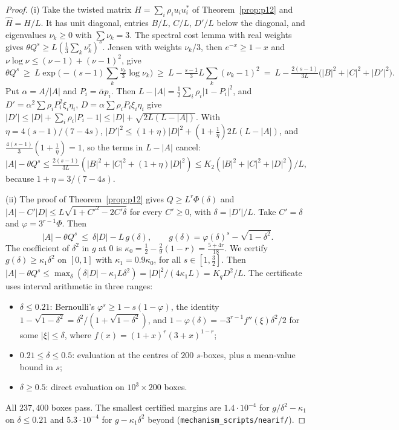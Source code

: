 \documentclass[11pt]{article}
\theoremstyle{definition}
\begin{document}
\begin{proof}
(i) Take the twisted matrix $H=\sum_i\rho_iu_iu_i^*$ of Theorem~\ref{prop:p12} and $\hat H=H/L$.  It has unit diagonal, entries $B/L$, $C/L$, $D'/L$ below the diagonal, and eigenvalues
$\nu_k\ge0$ with $\sum\nu_k=3$.  The spectral cost lemma with real weights gives $\theta Q^s\ge L(\frac13\sum_k\nu_k^r)^s$.  Jensen with weights $\nu_k/3$, then
$e^{-x}\ge1-x$ and $\nu\log\nu\le(\nu-1)+(\nu-1)^2$, give
\[\theta Q^s\ \ge\ L\exp\Big(-(s-1)\sum_k\tfrac{\nu_k}3\log\nu_k\Big)\ \ge\ L-\tfrac{s-1}3L\sum_k(\nu_k-1)^2\ =\ L-\tfrac{2(s-1)}{3L}\big(|B|^2+|C|^2+|D'|^2\big).\]
Put $\alpha=A/|A|$ and $P_i=\bar\alpha p_i$.  Then $L-|A|=\frac12\sum_i\rho_i|1-P_i|^2$, and $D'=\alpha^2\sum\rho_iP_i^2\xi_i\eta_i$, $D=\alpha\sum\rho_iP_i\xi_i\eta_i$ give
$|D'|\le|D|+\sum_i\rho_i|P_i-1|\le|D|+\sqrt{2L(L-|A|)}$.  With $\eta=4(s-1)/(7-4s)$, $|D'|^2\le(1+\eta)|D|^2+(1+\frac1\eta)2L(L-|A|)$, and
$\frac{4(s-1)}3(1+\frac1\eta)=1$, so the terms in $L-|A|$ cancel:
$|A|-\theta Q^s\le\frac{2(s-1)}{3L}(|B|^2+|C|^2+(1+\eta)|D|^2)\le K_2(|B|^2+|C|^2+|D|^2)/L$, because $1+\eta=3/(7-4s)$.

(ii) The proof of Theorem~\ref{prop:p12} gives $Q\ge L^r\Phi(\delta)$ and $|A|-C'|D|\le L\sqrt{1+C'^2-2C'\delta}$ for every $C'\ge0$, with $\delta=|D'|/L$.  Take $C'=\delta$ and $\varphi=3^{r-1}\Phi$.  Then
\[|A|-\theta Q^s\ \le\ \delta|D|-L\,g(\delta),\qquad g(\delta)=\varphi(\delta)^s-\sqrt{1-\delta^2}.\]
The coefficient of $\delta^2$ in $g$ at $0$ is $\kappa_0=\frac12-\frac29(1-r)=\frac{5+4r}{18}$.  We certify $g(\delta)\ge\kappa_1\delta^2$ on $[0,1]$ with $\kappa_1=0.9\kappa_0$, for all $s\in[1,\frac32]$.
Then $|A|-\theta Q^s\le\max_\delta(\delta|D|-\kappa_1L\delta^2)=|D|^2/(4\kappa_1L)=K_qD^2/L$.  The certificate uses interval arithmetic in three ranges:
\begin{itemize}
\item $\delta\le0.21$: Bernoulli's $\varphi^s\ge1-s(1-\varphi)$, the identity $1-\sqrt{1-\delta^2}=\delta^2/(1+\sqrt{1-\delta^2})$, and $1-\varphi(\delta)=-3^{r-1}f''(\xi)\delta^2/2$ for some $|\xi|\le\delta$, where $f(x)=(1+x)^r(3+x)^{1-r}$;
\item $0.21\le\delta\le0.5$: evaluation at the centres of $200$ $s$-boxes, plus a mean-value bound in $s$;
\item $\delta\ge0.5$: direct evaluation on $10^3\times200$ boxes.
\end{itemize}
All $237{,}400$ boxes pass.  The smallest certified margins are $1.4\cdot10^{-4}$ for $g/\delta^2-\kappa_1$ on $\delta\le0.21$ and $5.3\cdot10^{-4}$ for $g-\kappa_1\delta^2$ beyond (\texttt{mechanism\_scripts/nearif/}).
\end{proof}
\end{document}
